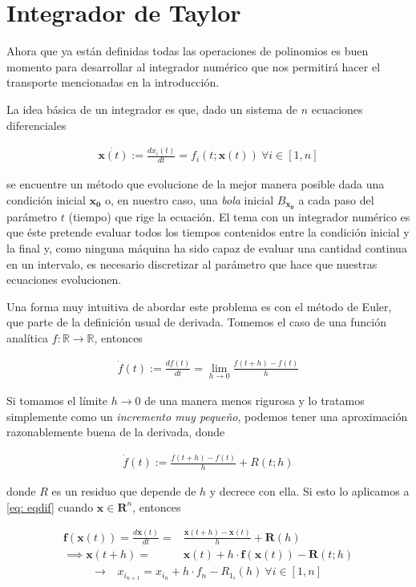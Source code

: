\section{Integrador de Taylor}

Ahora que ya están definidas todas las operaciones de polinomios es buen momento para desarrollar al integrador numérico que nos permitirá hacer el transporte mencionadas en la introducción.

La idea básica de un integrador es que, dado un sistema de $n$ ecuaciones diferenciales

\begin{align}
 \dot{\bm{x}(t)} := \frac{dx_i(t)}{dt} = f_i(t;\bm{x}(t)) \ \forall i \in [1,n]
 \label{eq: eqdif}
\end{align}

se encuentre un método que evolucione de la mejor manera posible dada una condición inicial $\bm{x_0}$ o, en nuestro caso, una \textit{bola} inicial {$B_{\bm{x_0}}$} a cada paso del parámetro $t$ (tiempo) que rige la ecuación. El tema con un integrador numérico es que éste pretende evaluar todos los tiempos contenidos entre la condición inicial y la final y, como ninguna máquina ha sido capaz de evaluar una cantidad continua en un intervalo, es necesario discretizar al parámetro que hace que nuestras ecuaciones evolucionen.

Una forma muy intuitiva de abordar este problema es con el método de Euler, que parte de la definición usual de derivada. Tomemos el caso de una función analítica $f: \mathbb{R}  \to \mathbb{R}$, entonces

\begin{align}
 \dot{f}(t) := \frac{df(t)}{dt} = \lim_{h\to 0} \frac{ f(t+h) - f(t) }{h}
 \label{eq: deriv}
\end{align}

Si tomamos el límite $h \to 0$ de una manera menos rigurosa y lo tratamos simplemente como un \textit{incremento muy pequeño}, podemos tener una aproximación razonablemente buena de la derivada, donde

\begin{align*}
\dot{f}(t) := \frac{ f(t+h) - f(t) }{h} + R(t;h)
\end{align*}

donde $R$ es un residuo que depende de $h$ y decrece con ella. Si esto lo aplicamos a \ref{eq: eqdif} cuando $\textbf{x} \in \bm{R}^n$, entonces

\begin{align}
 \bm{f}(\bm{x}(t)) = \frac{d\bm{x}(t)}{dt} =& \frac{ \bm{x}(t+h) - \bm{x}(t) }{h}+ \bm{R}(h)\\
 \implies \bm{x}(t+h) =& \bm{x}(t) + h\cdot \bm{f}(\bm{x}(t)) - \bm{R}(t;h)
 \label{eq: poli1g}
\end{align}
\begin{align}
 \to \ & x_{i_{n+1}} = x_{i_n} + h\cdot f_n - R_{1_i}(h) \ \forall i \in [1,n]
 \label{eq: euler}
\end{align}

